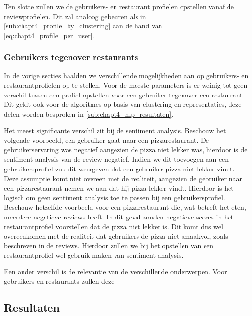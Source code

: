 Ten slotte zullen we de gebruikers- en restaurant profielen opstellen vanaf de reviewprofielen. Dit zal analoog gebeuren als in \autoref{sub:chapt4_profile_by_clustering} aan de hand van \autoref{eq:chapt4_profile_per_user}.

\subsubsection{Gebruikers tegenover restaurants}
\label{sub:chapt4_users_vs_restaurants}
In de vorige secties haalden we verschillende mogelijkheden aan op gebruikers- en restaurantprofielen op te stellen. Voor de meeste parameters is er weinig tot geen verschil tussen een profiel opstellen voor een gebruiker tegenover een restaurant.
Dit geldt ook voor de algoritmes op basis van clustering en representaties, deze delen worden besproken in \autoref{sub:chapt4_nlp_resultaten}.

Het meest significante verschil zit bij de sentiment analysis. Beschouw het volgende voorbeeld, een gebruiker gaat naar een pizzarestaurant. De gebruikerservaring was negatief aangezien de pizza niet lekker was, hierdoor is de sentiment analysis van de review negatief. Indien we dit toevoegen aan een gebruikersprofiel zou dit weergeven dat een gebruiker pizza niet lekker vindt. Deze assumptie komt niet overeen met de realiteit, aangezien de gebruiker naar een pizzarestaurant nemen we aan dat hij pizza lekker vindt. Hierdoor is het logisch om geen sentiment analysis toe te passen bij een gebruikersprofiel. \newline
Beschouw hetzelfde voorbeeld voor een pizzarestaurant die, wat betreft het eten, meerdere negatieve reviews heeft. In dit geval zouden negatieve scores in het restaurantprofiel voorstellen dat de pizza niet lekker is. Dit komt dus wel overeenkomen met de realiteit dat gebruikers de pizza niet smaakvol, zoals beschreven in de reviews. Hierdoor zullen we bij het opstellen van een restaurantprofiel wel gebruik maken van sentiment analysis.

Een ander verschil is de relevantie van de verschillende onderwerpen. Voor gebruikers en restaurants zullen deze %

\subsection{Resultaten}
\label{sub:chapt4_nlp_resultaten}

